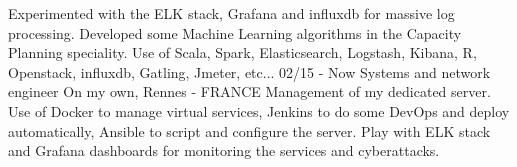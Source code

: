 \documentclass[]{friggeri-cv}
\begin{document}
\begin{entrylist}
{    %
    Experimented with the ELK stack, Grafana and influxdb for massive log processing.
    Developed some Machine Learning algorithms in the Capacity Planning speciality.     
	Use of Scala, Spark, Elasticsearch, Logstash, Kibana, R, Openstack, influxdb, Gatling, Jmeter, etc...
}
  \entry
    {02/15 - Now}
    {Systems and network engineer}
    {On my own, Rennes - FRANCE}
    {Management of my dedicated server. 
    Use of Docker to manage virtual services, Jenkins to do some DevOps and deploy automatically, Ansible to script and configure the server. Play with ELK stack and Grafana dashboards for monitoring the services and cyberattacks.}
\end{entrylist}

\end{document}
